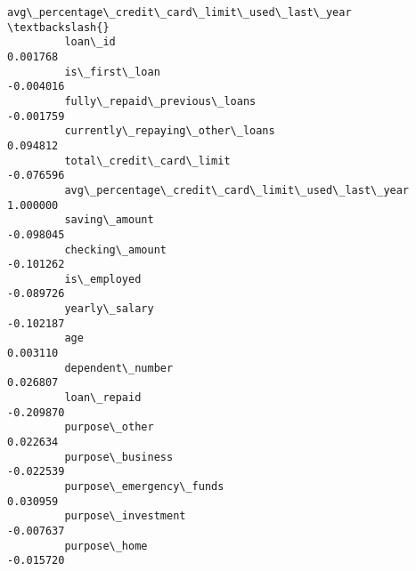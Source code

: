 \documentclass{report}
\begin{document}
\begin{Verbatim}[commandchars=\\\{\}]
                                                          avg\_percentage\_credit\_card\_limit\_used\_last\_year  \textbackslash{}
         loan\_id                                                                                 0.001768   
         is\_first\_loan                                                                          -0.004016   
         fully\_repaid\_previous\_loans                                                            -0.001759   
         currently\_repaying\_other\_loans                                                          0.094812   
         total\_credit\_card\_limit                                                                -0.076596   
         avg\_percentage\_credit\_card\_limit\_used\_last\_year                                         1.000000   
         saving\_amount                                                                          -0.098045   
         checking\_amount                                                                        -0.101262   
         is\_employed                                                                            -0.089726   
         yearly\_salary                                                                          -0.102187   
         age                                                                                     0.003110   
         dependent\_number                                                                        0.026807   
         loan\_repaid                                                                            -0.209870   
         purpose\_other                                                                           0.022634   
         purpose\_business                                                                       -0.022539   
         purpose\_emergency\_funds                                                                 0.030959   
         purpose\_investment                                                                     -0.007637   
         purpose\_home                                                                           -0.015720   
         

\end{Verbatim}
\end{document}

